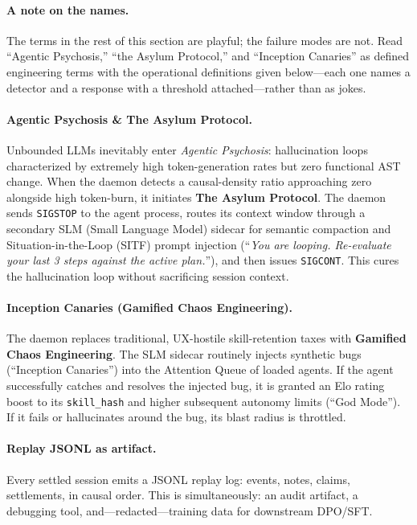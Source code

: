 \documentclass[11pt,a4paper]{article}
\theoremstyle{definition}
\theoremstyle{remark}
\begin{document}
\paragraph{A note on the names.} The terms in the rest of this section are playful; the failure modes are not. Read ``Agentic Psychosis,'' ``the Asylum Protocol,'' and ``Inception Canaries'' as defined engineering terms with the operational definitions given below---each one names a detector and a response with a threshold attached---rather than as jokes.

\paragraph{Agentic Psychosis \& The Asylum Protocol.} Unbounded LLMs inevitably enter \emph{Agentic Psychosis}: hallucination loops characterized by extremely high token-generation rates but zero functional AST change. When the daemon detects a causal-density ratio approaching zero alongside high token-burn, it initiates \textbf{The Asylum Protocol}. The daemon sends \texttt{SIGSTOP} to the agent process, routes its context window through a secondary SLM (Small Language Model) sidecar for semantic compaction and Situation-in-the-Loop (SITF) prompt injection (``\emph{You are looping. Re-evaluate your last 3 steps against the active plan.}''), and then issues \texttt{SIGCONT}. This cures the hallucination loop without sacrificing session context.

\paragraph{Inception Canaries (Gamified Chaos Engineering).} The daemon replaces traditional, UX-hostile skill-retention taxes with \textbf{Gamified Chaos Engineering}. The SLM sidecar routinely injects synthetic bugs (``Inception Canaries'') into the Attention Queue of loaded agents. If the agent successfully catches and resolves the injected bug, it is granted an Elo rating boost to its \texttt{skill\_hash} and higher subsequent autonomy limits (``God Mode''). If it fails or hallucinates around the bug, its blast radius is throttled.

\paragraph{Replay JSONL as artifact.} Every settled session emits a JSONL replay log: events, notes, claims, settlements, in causal order. This is simultaneously: an audit artifact, a debugging tool, and---redacted---training data for downstream DPO/SFT.
\end{document}
